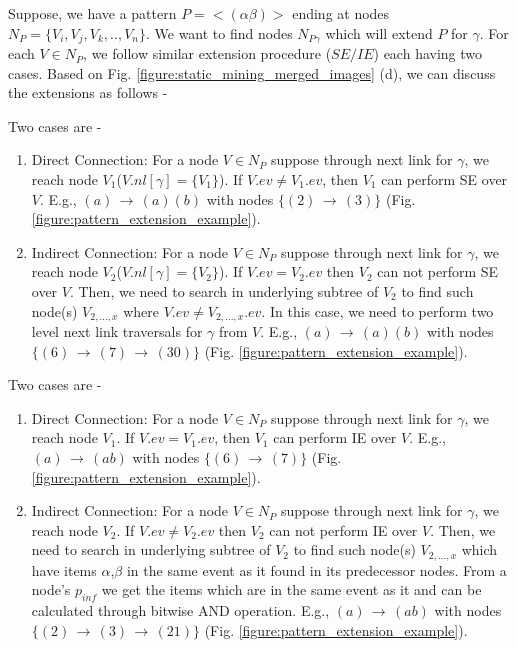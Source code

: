 Suppose, we have a pattern $P=< (\alpha\beta) >$ ending at nodes $N_{P}=\{V_{i},V_{j},V_{k},..,V_{n}\}$. We want to find nodes $N_{P\gamma}$ which will extend $P$ for $\gamma$. For each $V \in N_{P}$, we follow similar extension procedure ($SE/IE$) each having two cases. Based on Fig. \ref{figure:static_mining_merged_images} (d), we can discuss the extensions as follows -

\begin{definition}
Two cases are -
\begin{enumerate}
    \item Direct Connection: For a node $V \in N_{P}$ suppose through next link for $\gamma$, we reach node $V_{1}$($V.nl[\gamma]=\{V_{1}\}$). If $V.ev \neq V_{1}.ev$, then $V_{1}$ can perform SE over $V$. E.g., $(a)\,\to\,(a)(b)$ with nodes $\{(2)\,\to\,(3)\}$ (Fig. \ref{figure:pattern_extension_example}).
    \item Indirect Connection:  For a node $V \in N_{P}$ suppose through next link for $\gamma$, we reach node $V_{2}$($V.nl[\gamma]=\{V_{2}\}$). If $V.ev = V_{2}.ev$ then $V_{2}$ can not perform SE over $V$. Then, we need to search in underlying subtree of $V_{2}$ to find such node(s) $V_{2,...,x}$ where $V.ev \neq V_{2,...,x}.ev$. In this case, we need to perform two level next link traversals for $\gamma$ from $V$. E.g., $(a)\,\to\,(a)(b)$ with nodes $\{(6)\,\to\,(7)\,\to\,(30)\}$ (Fig. \ref{figure:pattern_extension_example}).
\end{enumerate}
\end{definition}


\begin{definition}
Two cases are -
\begin{enumerate}
    \item Direct Connection:  For a node $V \in N_{P}$ suppose through next link for $\gamma$, we reach node $V_{1}$. If $V.ev = V_{1}.ev$, then $V_{1}$ can perform IE over $V$. E.g., $(a)\,\to\,(ab)$ with nodes $\{(6)\,\to\,(7)\}$ (Fig. \ref{figure:pattern_extension_example}).
    \item Indirect Connection:  For a node $V \in N_{P}$ suppose through next link for $\gamma$, we reach node $V_{2}$.  If $V.ev \neq V_{2}.ev$ then $V_{2}$ can not perform IE over $V$. Then, we need to search in underlying subtree of $V_{2}$ to find such node(s) $V_{2,...,x}$ which have items $\alpha$,$\beta$ in the same event as it found in its predecessor nodes. From a node's $p_{inf}$ we get the items which are in the same event as it and can be calculated through bitwise AND operation. E.g., $(a)\,\to\,(ab)$ with nodes $\{(2)\,\to\,(3)\,\to\,(21)\}$ (Fig. \ref{figure:pattern_extension_example}).
\end{enumerate}
\end{definition}

